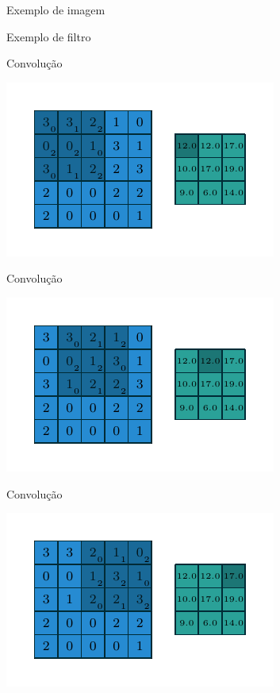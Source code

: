 \documentclass[10pt]{beamer}
\begin{document}
\begin{frame}{Exemplo de imagem}

\end{frame}

\begin{frame}{Exemplo de filtro}

\end{frame}


\begin{frame}{Convolução}
\begin{center}
\includegraphics[scale=1.5]{images/numerical_no_padding_no_strides_00.pdf}
\end{center}
\end{frame}

\begin{frame}{Convolução}
\begin{center}
\includegraphics[scale=1.5]{images/numerical_no_padding_no_strides_01.pdf}
\end{center}
\end{frame}

\begin{frame}{Convolução}
\begin{center}
\includegraphics[scale=1.5]{images/numerical_no_padding_no_strides_02.pdf}
\end{center}
\end{frame}
\end{document}
